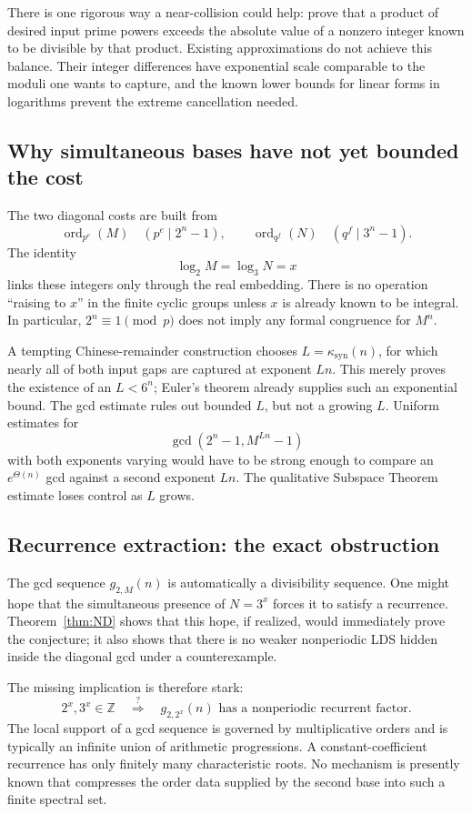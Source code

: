 \documentclass[11pt,oneside]{article}
\theoremstyle{definition}
\theoremstyle{remark}
\newcommand{\Z}{\mathbb Z}
\newcommand{\ord}{\operatorname{ord}}
\begin{document}
There is one rigorous way a near-collision could help: prove that a product of desired input
prime powers exceeds the absolute value of a nonzero integer known to be divisible by that
product.  Existing approximations do not achieve this balance.  Their integer differences
have exponential scale comparable to the moduli one wants to capture, and the known lower
bounds for linear forms in logarithms prevent the extreme cancellation needed.

\subsection{Why simultaneous bases have not yet bounded the cost}

The two diagonal costs are built from
\[
 \ord_{p^e}(M)\quad(p^e\mid2^n-1),
 \qquad
 \ord_{q^f}(N)\quad(q^f\mid3^n-1).
\]
The identity
\[
 \log_2 M=\log_3 N=x
\]
links these integers only through the real embedding.  There is no operation ``raising to
$x$'' in the finite cyclic groups unless $x$ is already known to be integral.  In particular,
$2^n\equiv1\pmod p$ does not imply any formal congruence for $M^n$.

A tempting Chinese-remainder construction chooses
$L=\kappa_{\mathrm{syn}}(n)$, for which nearly all of both input gaps are captured at exponent
$Ln$.  This merely proves the existence of an $L<6^n$; Euler's theorem already supplies such
an exponential bound.  The gcd estimate rules out bounded $L$, but not a growing $L$.
Uniform estimates for
\[
 \gcd(2^n-1,M^{Ln}-1)
\]
with both exponents varying would have to be strong enough to compare an $e^{\Theta(n)}$ gcd
against a second exponent $Ln$.  The qualitative Subspace Theorem estimate loses control as
$L$ grows.

\subsection{Recurrence extraction: the exact obstruction}

The gcd sequence $g_{2,M}(n)$ is automatically a divisibility sequence.  One might hope that
the simultaneous presence of $N=3^x$ forces it to satisfy a recurrence.  Theorem~\ref{thm:ND}
shows that this hope, if realized, would immediately prove the conjecture; it also shows that
there is no weaker nonperiodic LDS hidden inside the diagonal gcd under a counterexample.

The missing implication is therefore stark:
\[
 2^x,3^x\in\Z
 \quad\stackrel{?}{\Longrightarrow}\quad
 g_{2,2^x}(n)\text{ has a nonperiodic recurrent factor.}
\]
The local support of a gcd sequence is governed by multiplicative orders and is typically an
infinite union of arithmetic progressions.  A constant-coefficient recurrence has only
finitely many characteristic roots.  No mechanism is presently known that compresses the
order data supplied by the second base into such a finite spectral set.
\end{document}
